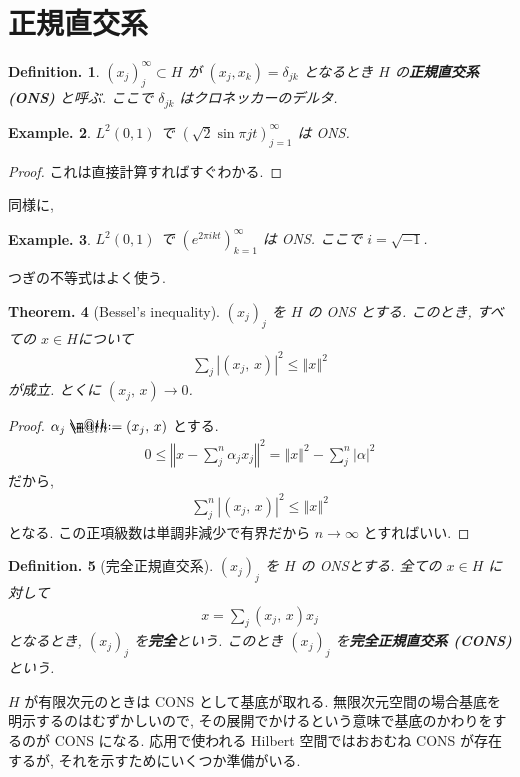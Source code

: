 \documentclass[openany, a4paper, oneside]{jsbook}
\makeatletter
\newcommand*{\defeq}{\mathrel{\rlap{%
\raisebox{0.3ex}{$\m@th\cdot$}}%
\raisebox{-0.3ex}{$\m@th\cdot$}}%
=}
\theoremstyle{break}
\newtheorem{thm}{Theorem.}[section]
\theoremstyle{breakdefn}
\newtheorem{defn}[thm]{Definition.}
\newtheorem{ex}[thm]{Example.}
\newcommand{\abs}[1]{\left|#1\right|}
\newcommand{\norm}[1]{\left\Vert#1\right\Vert}
\newcommand{\rbkt}[2]{\left ( #1,\,#2 \right)}
\makeatother
\begin{document}
\section{正規直交系}


\begin{defn}
$(x_j)_j^{\infty} \subset H$ が $(x_j, x_k) = \delta_{jk}$ となるとき
$H$ の\textbf{正規直交系(ONS)} と呼ぶ.
ここで $\delta_{jk}$ はクロネッカーのデルタ.
\end{defn}
\begin{ex}
$L^2(0, 1)$ で $(\sqrt{2}\sin \pi jt)_{j=1}^{\infty}$ は ONS.
\end{ex}
\begin{proof}
これは直接計算すればすぐわかる.
\end{proof}
同様に,
\begin{ex}
$L^2(0, 1)$ で $(e^{2 \pi i k t})_{k=1}^{\infty}$ は ONS.
ここで $i = \sqrt{-1}$.
\end{ex}

つぎの不等式はよく使う.
\begin{thm}[Bessel's inequality]
 $(x_j)_j$ を $H$ の ONS とする.
 このとき, すべての $x \in H $について
 \begin{align}
  \sum_j \abs{\rbkt{x_j}{x}}^2
  \le
  \norm{x}^2
 \end{align}
 が成立.
 とくに $\rbkt{x_j}{x} \to 0$.
\end{thm}
\begin{proof}
$\alpha_j \defeq \rbkt{x_j}{x}$ とする.
\begin{align}
 0
 \le
 \norm{x - \sum_j^n \alpha_j x_j}^2
 =
 \norm{x}^2 - \sum_j^n \abs{\alpha}^2
\end{align}
だから,
\begin{align}
 \sum_j^n \abs{\rbkt{x_j}{x}}^2
 \leq
 \norm{x}^2
\end{align}
となる.
この正項級数は単調非減少で有界だから $n \to \infty$ とすればいい.
\end{proof}

\begin{defn}[完全正規直交系]
$(x_j)_j$ を $H$ の ONSとする.
全ての $x \in H$ に対して
\begin{align}
 x
 =
 \sum_j \rbkt{x_j}{x} x_j
\end{align}
となるとき, $(x_j)_j$ を\textbf{完全}という.
このとき $(x_j)_j$ を\textbf{完全正規直交系 (CONS)} という.
\end{defn}
$H$ が有限次元のときは CONS として基底が取れる.
無限次元空間の場合基底を明示するのはむずかしいので,
その展開でかけるという意味で基底のかわりをするのが CONS になる.
応用で使われる Hilbert 空間ではおおむね CONS が存在するが,
それを示すためにいくつか準備がいる.
\end{document}
